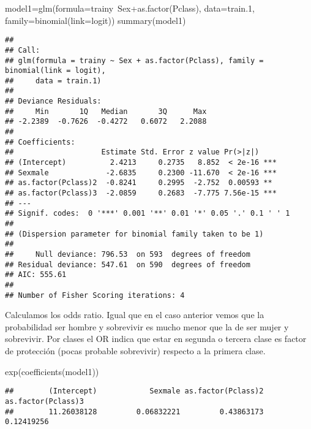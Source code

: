 \documentclass[
]{article}
\newenvironment{Shaded}{\begin{snugshade}}{\end{snugshade}}
\newcommand{\DataTypeTok}[1]{\textcolor[rgb]{0.87,0.87,0.75}{#1}}
\newcommand{\FloatTok}[1]{\textcolor[rgb]{0.75,0.75,0.82}{#1}}
\newcommand{\KeywordTok}[1]{\textcolor[rgb]{0.94,0.87,0.69}{#1}}
\newcommand{\NormalTok}[1]{\textcolor[rgb]{0.80,0.80,0.80}{#1}}
\newcommand{\OperatorTok}[1]{\textcolor[rgb]{0.94,0.94,0.82}{#1}}
\begin{document}
\begin{Shaded}
\begin{Highlighting}[]
\NormalTok{model1=}\KeywordTok{glm}\NormalTok{(}\DataTypeTok{formula=}\NormalTok{trainy}\OperatorTok{~}\NormalTok{Sex}\OperatorTok{+}\KeywordTok{as.factor}\NormalTok{(Pclass), }\DataTypeTok{data=}\NormalTok{train}\FloatTok{.1}\NormalTok{, }\DataTypeTok{family=}\KeywordTok{binomial}\NormalTok{(}\DataTypeTok{link=}\NormalTok{logit))}
\KeywordTok{summary}\NormalTok{(model1)}
\end{Highlighting}
\end{Shaded}

\begin{verbatim}
## 
## Call:
## glm(formula = trainy ~ Sex + as.factor(Pclass), family = binomial(link = logit), 
##     data = train.1)
## 
## Deviance Residuals: 
##     Min       1Q   Median       3Q      Max  
## -2.2389  -0.7626  -0.4272   0.6072   2.2088  
## 
## Coefficients:
##                    Estimate Std. Error z value Pr(>|z|)    
## (Intercept)          2.4213     0.2735   8.852  < 2e-16 ***
## Sexmale             -2.6835     0.2300 -11.670  < 2e-16 ***
## as.factor(Pclass)2  -0.8241     0.2995  -2.752  0.00593 ** 
## as.factor(Pclass)3  -2.0859     0.2683  -7.775 7.56e-15 ***
## ---
## Signif. codes:  0 '***' 0.001 '**' 0.01 '*' 0.05 '.' 0.1 ' ' 1
## 
## (Dispersion parameter for binomial family taken to be 1)
## 
##     Null deviance: 796.53  on 593  degrees of freedom
## Residual deviance: 547.61  on 590  degrees of freedom
## AIC: 555.61
## 
## Number of Fisher Scoring iterations: 4
\end{verbatim}

Calculamos los odds ratio. Igual que en el caso anterior vemos que la
probabilidad ser hombre y sobrevivir es mucho menor que la de ser mujer
y sobrevivir. Por clases el OR indica que estar en segunda o tercera
clase es factor de protección (pocas probable sobrevivir) respecto a la
primera clase.

\begin{Shaded}
\begin{Highlighting}[]
\KeywordTok{exp}\NormalTok{(}\KeywordTok{coefficients}\NormalTok{(model1))}
\end{Highlighting}
\end{Shaded}

\begin{verbatim}
##        (Intercept)            Sexmale as.factor(Pclass)2 as.factor(Pclass)3 
##        11.26038128         0.06832221         0.43863173         0.12419256
\end{verbatim}
\end{document}
